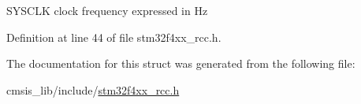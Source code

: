 S\+Y\+S\+C\+LK clock frequency expressed in Hz 

Definition at line 44 of file stm32f4xx\+\_\+rcc.\+h.



The documentation for this struct was generated from the following file\+:\begin{DoxyCompactItemize}
\item 
cmsis\+\_\+lib/include/\hyperlink{stm32f4xx__rcc_8h}{stm32f4xx\+\_\+rcc.\+h}\end{DoxyCompactItemize}

